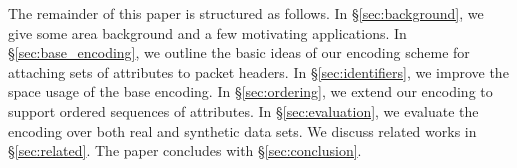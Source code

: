 
The remainder of this paper is structured as follows. In \S \ref{sec:background}, we give some area background and a few motivating applications. In \S \ref{sec:base_encoding}, we outline the basic ideas of our encoding scheme for attaching sets of attributes to packet headers. In \S \ref{sec:identifiers}, we improve the space usage of the base encoding. In \S \ref{sec:ordering}, we extend our encoding to support ordered sequences of attributes. In \S \ref{sec:evaluation}, we evaluate the encoding over both real and synthetic data sets. We discuss related works in \S \ref{sec:related}. The paper concludes with \S \ref{sec:conclusion}.






%

